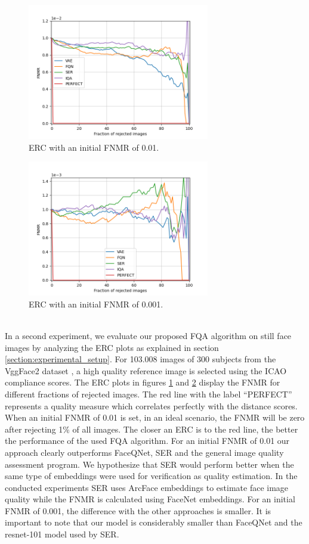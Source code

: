 \documentclass[letterpaper]{article} %
\begin{document}
\begin{figure}[t]
\centering
\includegraphics[width=225pt]{figures/FNMR_01.png}
\caption{ERC with an initial FNMR of 0.01.}
\label{fig:vggface2_fnmr_01}
\end{figure}
\begin{figure}[h]
\centering
\includegraphics[width=225pt]{figures/FNMR_001.png}
\caption{ERC with an initial FNMR of 0.001.}
\label{fig:vggface2_fnmr_001}
\end{figure}
\\
\newline
In a second experiment, we evaluate our proposed FQA algorithm on still face images by analyzing the ERC plots as explained in section \ref{section:experimental_setup}. For 103.008 images of 300 subjects from the VggFace2 dataset \cite{Cao18}, a high quality reference image is selected using the ICAO compliance scores. The ERC plots in figures \ref{fig:vggface2_fnmr_01} and \ref{fig:vggface2_fnmr_001} display the FNMR for different fractions of rejected images. The red line with the label ``PERFECT'' represents a quality measure which correlates perfectly with the distance scores. When an initial FNMR of 0.01 is set, in an ideal scenario, the FNMR will be zero after rejecting 1\% of all images. The closer an ERC is to the red line, the better the performance of the used FQA algorithm. For an initial FNMR of 0.01 our approach clearly outperforms FaceQNet, SER and the general image quality assessment program. We hypothesize that SER would perform better when the same type of embeddings were used for verification as quality estimation. In the conducted experiments SER uses ArcFace \cite{deng2018arcface} embeddings to estimate face image quality while the FNMR is calculated using FaceNet embeddings. For an initial FNMR of 0.001, the difference with the other approaches is smaller. It is important to note that our model is considerably smaller than FaceQNet and the resnet-101 model \cite{he2016deep} used by SER.
\end{document}
